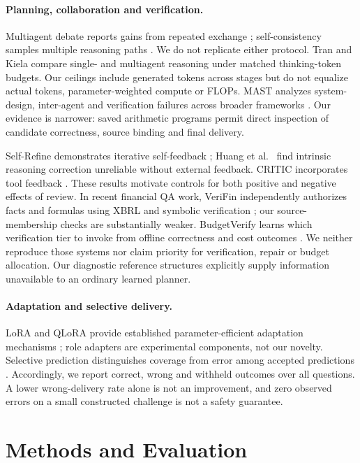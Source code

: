 \documentclass[10pt]{article}
\begin{document}
\paragraph{Planning, collaboration and verification.}
Multiagent debate reports gains from repeated exchange \citep{debate}; self-consistency samples multiple reasoning paths \citep{selfconsistency}. We do not replicate either protocol. Tran and Kiela \citep{equalbudget} compare single- and multiagent reasoning under matched thinking-token budgets. Our ceilings include generated tokens across stages but do not equalize actual tokens, parameter-weighted compute or FLOPs. MAST analyzes system-design, inter-agent and verification failures across broader frameworks \citep{mast}. Our evidence is narrower: saved arithmetic programs permit direct inspection of candidate correctness, source binding and final delivery.

Self-Refine demonstrates iterative self-feedback \citep{selfrefine}; Huang et al.\ \citep{selfcorrect} find intrinsic reasoning correction unreliable without external feedback. CRITIC incorporates tool feedback \citep{critic}. These results motivate controls for both positive and negative effects of review. In recent financial QA work, VeriFin independently authorizes facts and formulas using XBRL and symbolic verification \citep{verifin}; our source-membership checks are substantially weaker. BudgetVerify learns which verification tier to invoke from offline correctness and cost outcomes \citep{budgetverify}. We neither reproduce those systems nor claim priority for verification, repair or budget allocation. Our diagnostic reference structures explicitly supply information unavailable to an ordinary learned planner.

\paragraph{Adaptation and selective delivery.}
LoRA and QLoRA provide established parameter-efficient adaptation mechanisms \citep{lora,qlora}; role adapters are experimental components, not our novelty. Selective prediction distinguishes coverage from error among accepted predictions \citep{selective}. Accordingly, we report correct, wrong and withheld outcomes over all questions. A lower wrong-delivery rate alone is not an improvement, and zero observed errors on a small constructed challenge is not a safety guarantee.

\section{Methods and Evaluation}
\end{document}
